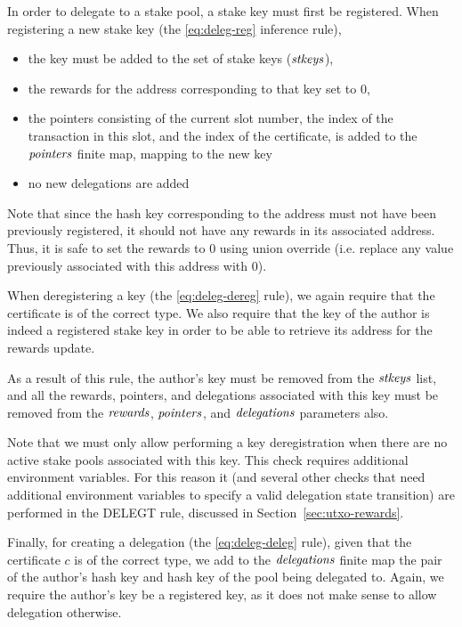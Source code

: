 In order to delegate to a stake pool, a stake key must first be registered.
When registering a new stake key (the \cref{eq:deleg-reg} inference rule),

\begin{itemize}
\item the key must be
added to the set of stake keys ($\mathit{stkeys}$),
\item the rewards for the address
corresponding to that key set to 0,
\item the pointers consisting of the current slot number, the
index of the transaction in this slot, and the index of the certificate, is
added to the $\mathit{pointers}$ finite map, mapping to the new key
\item no new delegations are added
\end{itemize}

Note that
since the hash key corresponding to the address must not have been previously
registered,
it should not have any rewards in its associated address. Thus, it is safe
to set the rewards to 0 using union override (i.e. replace any value previously
associated with this address with 0).

When deregistering a key (the \cref{eq:deleg-dereg} rule), we again
require that the certificate is of the correct type. We also require
that the key of the author is indeed a registered stake key
in order to be able to retrieve its address for the rewards update.

As a result of this rule, the author's key must be removed from the $\mathit{stkeys}$ list,
and all the rewards, pointers, and delegations associated with this key must be removed
from the $\mathit{rewards}$, $\mathit{pointers}$, and $\mathit{delegations}$ parameters also.

Note that we must only allow performing a key deregistration when there
are no active stake pools associated with this key. This check requires additional
environment variables. For this reason
it (and several other checks that need
additional environment variables to specify a valid delegation state transition)
are performed in the DELEGT rule, discussed in Section~\ref{sec:utxo-rewards}.

Finally, for creating a delegation (the \cref{eq:deleg-deleg} rule),
given that the certificate $c$ is of the correct type, we add to the
$\mathit{delegations}$ finite map the pair of
the author's hash key and hash key of the pool being delegated to.
Again, we require the author's key be a registered key, as it does not make
sense to allow delegation otherwise.

